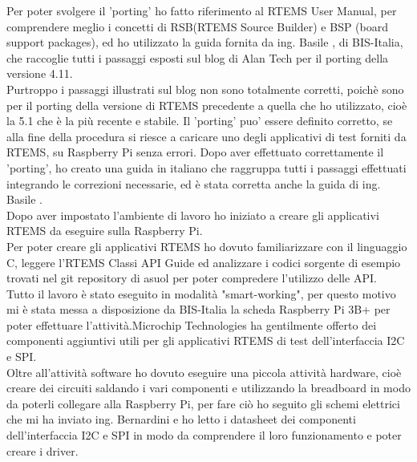 \documentclass[12pt, a4paper, titlepage, oneside]{book}
\begin{document}
\begin{flushleft}
Per poter svolgere il 'porting' ho fatto riferimento al RTEMS User Manual\cite{rtemsUM}, per comprendere meglio i concetti di RSB(RTEMS Source Builder) e BSP (board support packages), 
ed ho utilizzato la guida fornita da ing. Basile \cite{giorgio}, di BIS-Italia, che raccoglie tutti i passaggi esposti sul blog di Alan Tech per il porting della versione 4.11.\\
Purtroppo i passaggi illustrati sul blog non sono totalmente corretti, poichè sono per il porting della versione di RTEMS precedente a quella che ho utilizzato, cioè la 5.1 che è la più recente e stabile.
Il 'porting' puo' essere definito corretto, se alla fine della procedura si riesce a caricare uno degli applicativi di test forniti da RTEMS, su Raspberry Pi senza errori.
Dopo aver effettuato correttamente il 'porting', ho creato una guida in italiano  che raggruppa tutti i passaggi effettuati integrando le correzioni necessarie, ed è stata corretta anche la guida di ing. Basile \cite{giorgio5}.\\
Dopo aver impostato l'ambiente di lavoro ho iniziato a creare gli applicativi RTEMS da eseguire sulla Raspberry Pi.\\
Per poter creare gli applicativi RTEMS ho dovuto  familiarizzare con il linguaggio C, leggere l'RTEMS Classi API Guide \cite{rtemsCAG} ed analizzare i codici sorgente di esempio trovati nel git repository di asuol\cite{asuol} per poter compredere l'utilizzo delle API. \\
Tutto il lavoro è stato eseguito in modalità "smart-working", per questo motivo mi è stata messa a disposizione da BIS-Italia la scheda Raspberry Pi 3B+ per poter effettuare l'attività.Microchip Technologies ha gentilmente offerto dei componenti aggiuntivi utili per gli applicativi RTEMS di test dell'interfaccia I2C e SPI.\\
Oltre all'attività software ho dovuto eseguire una piccola attività hardware, cioè creare dei circuiti saldando i vari componenti e utilizzando la breadboard in modo da poterli collegare alla Raspberry Pi, per fare ciò ho seguito gli schemi elettrici che mi ha inviato ing. Bernardini e ho letto i datasheet dei componenti dell'interfaccia I2C \cite{microchipMCP3425} \cite{microchipADC} e  SPI \cite{microchipMCP4822} \cite{microchipMSOP10-8} in modo da comprendere il loro funzionamento e poter creare i driver.\\

\end{flushleft}
\end{document}
